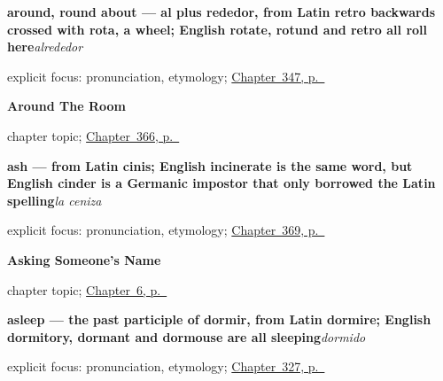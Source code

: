 \noindent\begin{minipage}[t]{\linewidth}
\raggedright
\textbf{around, round about — al plus rededor, from Latin retro backwards crossed with rota, a wheel; English rotate, rotund and retro all roll here}\enspace\emph{alrededor}\par
\footnotesize explicit focus: pronunciation, etymology; \hyperref[ch:el-norte-y-el-sur]{Chapter~347, p.~\pageref*{ch:el-norte-y-el-sur}}
\end{minipage}\par\smallskip

\noindent\begin{minipage}[t]{\linewidth}
\raggedright
\textbf{Around The Room}\par
\footnotesize chapter topic; \hyperref[ch:la-caja-y-la-lampara]{Chapter~366, p.~\pageref*{ch:la-caja-y-la-lampara}}
\end{minipage}\par\smallskip

\noindent\begin{minipage}[t]{\linewidth}
\raggedright
\textbf{ash — from Latin cinis; English incinerate is the same word, but English cinder is a Germanic impostor that only borrowed the Latin spelling}\enspace\emph{la ceniza}\par
\footnotesize explicit focus: pronunciation, etymology; \hyperref[ch:el-rio-y-la-arena]{Chapter~369, p.~\pageref*{ch:el-rio-y-la-arena}}
\end{minipage}\par\smallskip

\noindent\begin{minipage}[t]{\linewidth}
\raggedright
\textbf{Asking Someone's Name}\par
\footnotesize chapter topic; \hyperref[ch:asking-a-name]{Chapter~6, p.~\pageref*{ch:asking-a-name}}
\end{minipage}\par\smallskip

\noindent\begin{minipage}[t]{\linewidth}
\raggedright
\textbf{asleep — the past participle of dormir, from Latin dormire; English dormitory, dormant and dormouse are all sleeping}\enspace\emph{dormido}\par
\footnotesize explicit focus: pronunciation, etymology; \hyperref[ch:despierto-y-sano]{Chapter~327, p.~\pageref*{ch:despierto-y-sano}}
\end{minipage}\par\smallskip

